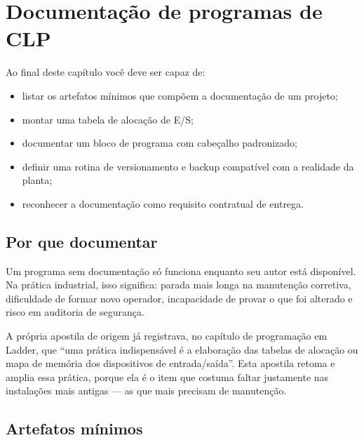 \chapter{Documentação de programas de CLP}
\label{cap:documentacao}

\begin{objetivos}
Ao final deste capítulo você deve ser capaz de:
\begin{itemize}
  \item listar os artefatos mínimos que compõem a documentação de um projeto;
  \item montar uma tabela de alocação de E/S;
  \item documentar um bloco de programa com cabeçalho padronizado;
  \item definir uma rotina de versionamento e backup compatível com a realidade da planta;
  \item reconhecer a documentação como requisito contratual de entrega.
\end{itemize}
\end{objetivos}

\section{Por que documentar}

Um programa sem documentação só funciona enquanto seu autor está disponível. Na prática industrial,
isso significa: parada mais longa na manutenção corretiva, dificuldade de formar novo operador,
incapacidade de provar o que foi alterado e risco em auditoria de segurança.

A própria apostila de origem já registrava, no capítulo de programação em Ladder, que ``uma prática
indispensável é a elaboração das tabelas de alocação ou mapa de memória dos dispositivos de
entrada/saída''. Esta apostila retoma e amplia essa prática, porque ela é o item que costuma faltar
justamente nas instalações mais antigas --- as que mais precisam de manutenção.


\section{Artefatos mínimos}

